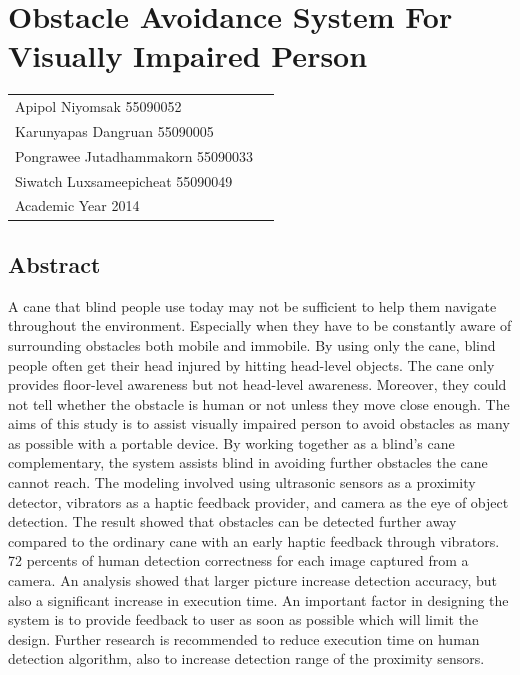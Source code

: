 \documentclass[11pt, oneside]{Thesis} %
\begin{document}
\clearpage %



\pagestyle{fancy}

\chapter{Obstacle Avoidance System For Visually Impaired Person}

\begin{flushright}
	\begin{tabular}{ll}
		Apipol Niyomsak 55090052 \\
		Karunyapas Dangruan 55090005 \\
		Pongrawee Jutadhammakorn 55090033 \\
		Siwatch Luxsameepicheat 55090049 \\
		Academic Year 2014
	\end{tabular}
\end{flushright}

\section*{Abstract}
A cane that blind people use today may not be sufficient to help them navigate throughout the environment. Especially when they have to be constantly aware of surrounding obstacles both mobile and immobile. By using only the cane, blind people often get their head injured by hitting head-level objects. The cane only provides floor-level awareness but not head-level awareness. Moreover, they could not tell whether the obstacle is human or not unless they move close enough. The aims of this study is to assist visually impaired person to avoid obstacles as many as possible with a portable device. By working together as a blind’s cane complementary, the system assists blind in avoiding further obstacles the cane cannot reach. The modeling involved using ultrasonic sensors as a proximity detector, vibrators as a haptic feedback provider, and camera as the eye of object detection. 
The result showed that obstacles can be detected further away compared to the ordinary cane with an early haptic feedback through vibrators. 72 percents of human detection correctness for each image captured from a camera. An analysis showed that larger picture increase detection accuracy, but also a significant increase in execution time. An important factor in designing the system is to provide feedback to user as soon as possible which will limit the design. Further research is recommended to reduce execution time on human detection algorithm, also to increase detection range of the proximity sensors.
\end{document}
